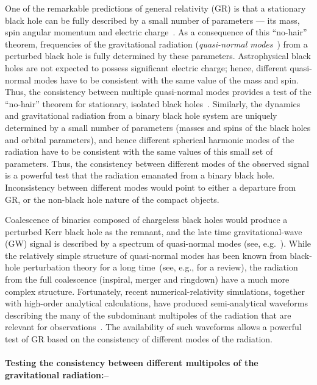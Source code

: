 \documentclass[prl,preprintnumbers,twocolumn,eqsecnum,floatfix,a4paper,nofootinbib,superscriptaddress]{revtex4}
\begin{document}
One of the remarkable predictions of general relativity (GR) is that a stationary black hole can be fully described by a small number of parameters --- its mass, spin angular momentum and electric charge~\cite{Israel:1967,Israel:1968,Carter:1978}. As a consequence of this ``no-hair'' theorem, frequencies of the gravitational radiation (\emph{quasi-normal modes}~\cite{Vishveshwara:1970zz,Press:1971wr,Chandrasekhar:1975zza}) from a perturbed black hole is fully determined by these parameters. Astrophysical black holes are not expected to possess significant electric charge; hence, different quasi-normal modes have to be consistent with the same value of the mass and spin. Thus, the consistency between multiple quasi-normal modes provides a test of the ``no-hair'' theorem for stationary, isolated black holes~\cite{Dreyer:2003bv}. Similarly, the dynamics and gravitational radiation from a binary black hole system are uniquely determined by a small number of parameters (masses and spins of the black holes and orbital parameters), and hence different spherical harmonic modes of the radiation have to be consistent with the same values of this small set of parameters. Thus, the consistency between different modes of the observed signal is a powerful test that the radiation emanated from a binary black hole. Inconsistency between different modes would point to either a departure from GR, or the non-black hole nature of the compact objects. 

Coalescence of binaries composed of chargeless black holes would produce a perturbed Kerr black hole as the remnant, and the late time gravitational-wave (GW) signal is described by a spectrum of quasi-normal modes (see, e.g.~\cite{Buonanno:2006ui}). While the relatively simple structure of quasi-normal modes has been known from black-hole perturbation theory for a long time~(see, e.g., \cite{Berti:2009kk} for a review), the radiation from the full coalescence (inspiral, merger and ringdown) have a much more complex structure. Fortunately, recent numerical-relativity simulations, together with high-order analytical calculations, have produced semi-analytical waveforms describing the many of the subdominant multipoles of the radiation that are relevant for observations~\cite{Pan:2011gk,London:2017bcn,Mehta:2017jpq}. The availability of such waveforms allows a powerful test of GR based on the consistency of different modes of the radiation.  

\paragraph{Testing the consistency between different multipoles of the gravitational radiation:--}
\end{document}
